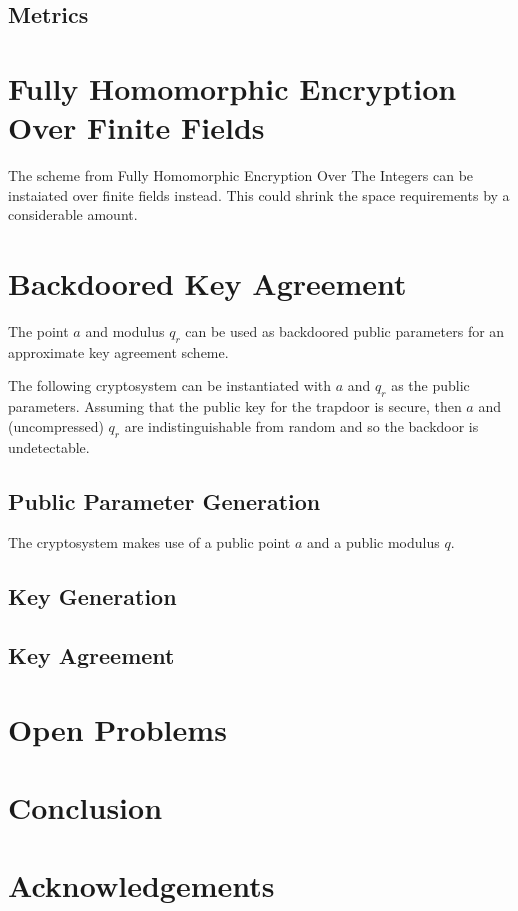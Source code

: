 \documentclass[preprint]{iacrtrans}
\begin{document}
\subsection{Metrics}
\todo{}

\section{Fully Homomorphic Encryption Over Finite Fields}
The scheme from Fully Homomorphic Encryption Over The Integers can be instaiated over finite fields instead. This could shrink the space requirements by a considerable amount.


\section{Backdoored Key Agreement}
The point $a$ and modulus $q_r$ can be used as backdoored public parameters for an approximate key agreement scheme.

The following cryptosystem can be instantiated with $a$ and $q_r$ as the public parameters. Assuming that the public key for the trapdoor is secure, then $a$ and (uncompressed) $q_r$ are indistinguishable from random and so the backdoor is undetectable.

\subsection{Public Parameter Generation}
The cryptosystem makes use of a public point $a$ and a public modulus $q$. 



\subsection{Key Generation}
\subsection{Key Agreement}
\section{Open Problems}
\todo{}

\section{Conclusion}
\todo{}

\section*{Acknowledgements}
\end{document}
